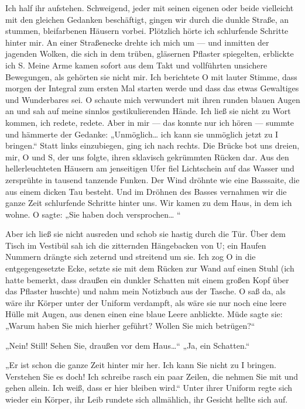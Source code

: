 Ich half ihr aufstehen. Schweigend, jeder mit seinen eigenen oder
beide vielleicht mit den gleichen Gedanken beschäftigt, gingen wir
durch die dunkle Straße, an stummen, bleifarbenen Häusern vorbei.
Plötzlich hörte ich schlurfende Schritte hinter mir. An einer
Straßenecke drehte ich mich um — und inmitten der jagenden Wolken,
die sich in dem trüben, gläsernen Pflaster spiegelten, erblickte
ich S. Meine Arme kamen sofort aus dem Takt und vollführten
unsichere Bewegungen, als gehörten sie nicht mir. Ich berichtete O
mit lauter Stimme, dass morgen der Integral zum ersten Mal starten
werde und dass das etwas Gewaltiges und Wunderbares sei. O schaute
mich verwundert mit ihren runden blauen Augen an und sah auf meine
sinnlos gestikulierenden Hände. Ich ließ sie nicht zu Wort kommen,
ich redete, redete. Aber in mir — das konnte nur ich hören —
summte und hämmerte der Gedanke: „Unmöglich\ldots{} ich kann sie
unmöglich jetzt zu I bringen.“ Statt links einzubiegen, ging ich
nach rechts. Die Brücke bot uns dreien, mir, O und S, der uns
folgte, ihren sklavisch gekrümmten Rücken dar. Aus den
hellerleuchteten Häusern am jenseitigen Ufer fiel Lichtschein auf
das Wasser und zersprühte in tausend tanzende Funken. Der Wind
dröhnte wie eine Basssaite, die aus einem dicken Tau besteht. Und
im Dröhnen des Basses vernahmen wir die ganze Zeit schlurfende
Schritte hinter uns. Wir kamen zu dem Haus, in dem ich wohne. O
sagte: „Sie haben doch versprochen\ldots{} “

Aber ich ließ sie nicht ausreden und schob sie hastig durch die
Tür. Über dem Tisch im Vestibül sah ich die zitternden Hängebacken
von U; ein Haufen Nummern drängte sich zeternd und streitend um
sie. Ich zog O in die entgegengesetzte Ecke, setzte sie mit dem
Rücken zur Wand auf einen Stuhl (ich hatte bemerkt, dass draußen
ein dunkler Schatten mit einem großen Kopf über das Pflaster
huschte) und nahm mein Notizbuch aus der Tasche. O saß da, als wäre
ihr Körper unter der Uniform verdampft, als wäre sie nur noch eine
leere Hülle mit Augen, aus denen einen eine blaue Leere anblickte.
Müde sagte sie: „Warum haben Sie mich hierher geführt? Wollen Sie
mich betrügen?“

„Nein! Still! Sehen Sie, draußen vor dem Haus\ldots{}“ „Ja, ein
Schatten.“

„Er ist schon die ganze Zeit hinter mir her. Ich kann Sie nicht zu
I bringen. Verstehen Sie es doch! Ich schreibe rasch ein paar
Zeilen, die nehmen Sie mit und gehen allein. Ich weiß, dass er hier
bleiben wird.“ Unter ihrer Uniform regte sich wieder ein Körper,
ihr Leib rundete sich allmählich, ihr Gesicht hellte sich auf.

